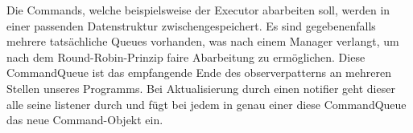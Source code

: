       \medskip
      Die Commands, welche beispielsweise der Executor abarbeiten soll, werden in
      einer passenden Datenstruktur zwischengespeichert. Es sind gegebenenfalls mehrere
      tatsächliche Queues vorhanden, was nach einem Manager verlangt, um nach dem
      Round-Robin-Prinzip faire Abarbeitung zu ermöglichen. Diese CommandQueue
      ist das empfangende Ende des \gls{observerpattern}s an mehreren Stellen unseres
      Programms. Bei Aktualisierung durch einen \gls{notifier} geht dieser alle
      seine \gls{listener} durch und fügt bei jedem in genau einer diese
      CommandQueue das neue Command-Objekt ein.